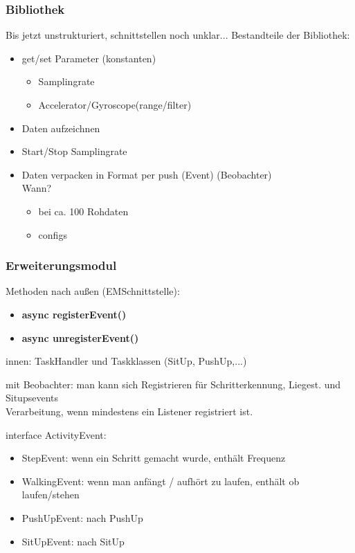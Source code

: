 \documentclass[a4paper,12pt]{article}
\begin{document}
\subsubsection{Bibliothek} 
Bis jetzt unstrukturiert, schnittstellen noch unklar...
Bestandteile der Bibliothek:
\begin{itemize}
    \item {
        get/set Parameter (konstanten)
        \begin{itemize}
            \item Samplingrate
            \item Accelerator/Gyroscope(range/filter)
        \end{itemize}
        }
    \item Daten aufzeichnen %
    \item Start/Stop Samplingrate
    \item {
        Daten verpacken in Format per push (Event) (Beobachter)\\
        Wann? %
        \begin{itemize}
            \item bei ca. 100 Rohdaten
            \item configs %
        \end{itemize}
        } 
\end{itemize}

\subsubsection{Erweiterungsmodul}
Methoden nach außen (EMSchnittstelle):
\begin{itemize}
    \item \textbf{async registerEvent()}
    \item \textbf{async unregisterEvent()}
\end{itemize}
innen: TaskHandler und Taskklassen (SitUp, PushUp,...)

mit Beobachter: man kann sich Registrieren für Schritterkennung, Liegest. und Situpsevents\\
Verarbeitung, wenn mindestens ein Listener registriert ist. 

interface ActivityEvent: 
\begin{itemize}
    \item StepEvent: wenn ein Schritt gemacht wurde, enthält Frequenz
    \item WalkingEvent: wenn man anfängt / aufhört zu laufen, enthält ob laufen/stehen 
    \item PushUpEvent: nach PushUp
    \item SitUpEvent: nach SitUp
\end{itemize}
\end{document}

